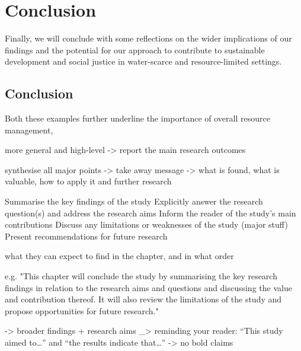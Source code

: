 
\chapter{Conclusion} %

\label{ChapterX} %

Finally, we will conclude with some reflections on the wider implications of our findings and the potential for our approach to contribute to sustainable development and social justice in water-scarce and resource-limited settings.

\section{Conclusion}

Both these examples further underline the importance of overall resource management, 


more general and high-level -> report the main research outcomes

synthesise all major points -> take away message
-> what is found, what is valuable, how to apply it and further research

Summarise the key findings of the study
Explicitly answer the research question(s) and address the research aims
Inform the reader of the study’s main contributions
Discuss any limitations or weaknesses of the study (major stuff)
Present recommendations for future research



what they can expect to find in the chapter, and in what order

e.g. "This chapter will conclude the study by summarising the key research findings in relation to the research aims and questions and discussing the value and contribution thereof. It will also review the limitations of the study and propose opportunities for future research."

-> broader findings + research aims
_> reminding your reader: “This study aimed to…” and “the results indicate that…”
-> no bold claims

